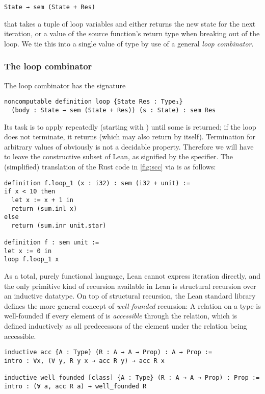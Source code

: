 \begin{verbatim}
State → sem (State + Res)
\end{verbatim}
that takes a tuple  of loop variables and either returns the new
state for the next iteration, or a value of the source function's return type
 when breaking out of the loop. We tie this into a single value of
type  by use of a general \emph{loop combinator}.

\subsubsection{The loop combinator}

The loop combinator has the signature

\begin{verbatim}
noncomputable definition loop {State Res : Type₁}
  (body : State → sem (State + Res)) (s : State) : sem Res
\end{verbatim}
Its task is to apply  repeatedly (starting with ) until some
 is returned; if the loop does not terminate, it returns 
(which  may also return by itself). Termination for arbitrary values
of  obviously is not a decidable property. Therefore we will have to leave
the constructive subset of Lean, as signified by the 
specifier. The (simplified) translation of the Rust code in \autoref{fig:scc} via
 is as follows:

\begin{verbatim}
definition f.loop_1 (x : i32) : sem (i32 + unit) :=
if x < 10 then
  let x := x + 1 in
  return (sum.inl x)
else
  return (sum.inr unit.star)

definition f : sem unit :=
let x := 0 in
loop f.loop_1 x
\end{verbatim}

As a total, purely functional language, Lean cannot express iteration directly,
and the only primitive kind of recursion available in Lean is structural recursion
over an inductive datatype. On top of structural recursion, the Lean standard
library defines the more general concept of \emph{well-founded} recursion: A
relation  on a type  is well-founded if every
element of  is \emph{accessible} through the relation, which is defined
inductively as all predecessors of the element under the relation being accessible.

\begin{verbatim}
inductive acc {A : Type} (R : A → A → Prop) : A → Prop :=
intro : ∀x, (∀ y, R y x → acc R y) → acc R x

inductive well_founded [class] {A : Type} (R : A → A → Prop) : Prop :=
intro : (∀ a, acc R a) → well_founded R
\end{verbatim}

